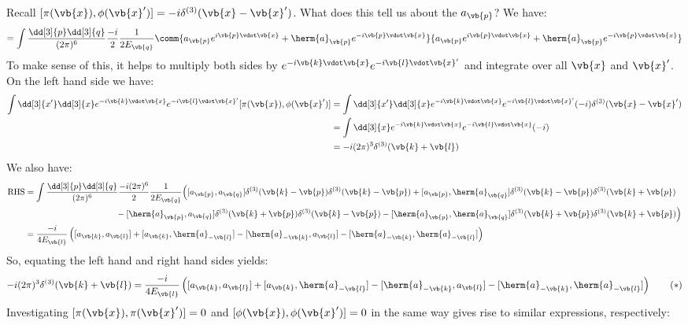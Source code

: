 \documentclass{jknotes} %
\begin{document}
Recall \([\pi(\vb{x}),\phi(\vb{x}')] = -i\delta^{(3)}(\vb{x}-\vb{x}')\). What does this tell us about the \(a_{\vb{p}}\)? We have:
\begin{equation}
    [\pi(\vb{x}),\phi(\vb{x}')] = \int\frac{\dd[3]{p}\dd[3]{q}}{(2\pi)^6}\frac{-i}{2}\frac{1}{2E_{\vb{q}}}
    \comm{a_{\vb{p}} e^{i\vb{p}\vdot\vb{x}} + \herm{a}_{\vb{p}} e^{-i\vb{p}\vdot\vb{x}}}{a_{\vb{p}} e^{i\vb{p}\vdot\vb{x}} + \herm{a}_{\vb{p}} e^{-i\vb{p}\vdot\vb{x}}}
\end{equation}
To make sense of this, it helps to multiply both sides by \(e^{-i\vb{k}\vdot\vb{x}}e^{-i\vb{l}\vdot\vb{x}'}\) and integrate over all \(\vb{x}\) and \(\vb{x}'\). On the left hand side we have:
\begin{align}
    \int\dd[3]{x'}\dd[3]{x} e^{-i\vb{k}\vdot\vb{x}}e^{-i\vb{l}\vdot\vb{x}'} [\pi(\vb{x}),\phi(\vb{x}')]
    &= \int\dd[3]{x'}\dd[3]{x} e^{-i\vb{k}\vdot\vb{x}}e^{-i\vb{l}\vdot\vb{x}'} (-i)\delta^{(3)}(\vb{x}-\vb{x}') \\
    &= \int\dd[3]{x} e^{-i\vb{k}\vdot\vb{x}}e^{-i\vb{l}\vdot\vb{x}} (-i) \\
    &= -i(2\pi)^3\delta^{(3)}(\vb{k}+\vb{l})
\end{align}
We also have:
\begin{align}
    \text{RHS} &= \int \frac{\dd[3]{p}\dd[3]{q}}{(2\pi)^6}\frac{-i(2\pi)^6}{2}\frac{1}{2E_{\vb{q}}} \Big(
    [a_{\vb{p}},a_{\vb{q}}] \delta^{(3)}(\vb{k}-\vb{p}) \delta^{(3)}(\vb{k}-\vb{p}) 
    + [a_{\vb{p}},\herm{a}_{\vb{q}}] \delta^{(3)}(\vb{k}-\vb{p}) \delta^{(3)}(\vb{k}+\vb{p}) \\
    &\qquad\qquad\qquad\qquad\qquad\;\;\,
    - [\herm{a}_{\vb{p}},a_{\vb{q}}] \delta^{(3)}(\vb{k}+\vb{p}) \delta^{(3)}(\vb{k}-\vb{p}) 
    - [\herm{a}_{\vb{p}},\herm{a}_{\vb{q}}] \delta^{(3)}(\vb{k}+\vb{p}) \delta^{(3)}(\vb{k}+\vb{p})
    \Big) \\
    &= \frac{-i}{4E_{\vb{l}}} \left( [a_{\vb{k}},a_{\vb{l}}] + [a_{\vb{k}},\herm{a}_{-\vb{l}}]
    -[\herm{a}_{-\vb{k}},a_{\vb{l}}] - [\herm{a}_{-\vb{k}},\herm{a}_{-\vb{l}}] \right)
\end{align}
So, equating the left hand and right hand sides yields:
\begin{equation}
    -i(2\pi)^3\delta^{(3)}(\vb{k}+\vb{l}) = 
    \frac{-i}{4E_{\vb{l}}} \left( [a_{\vb{k}},a_{\vb{l}}] + [a_{\vb{k}},\herm{a}_{-\vb{l}}]
    -[\herm{a}_{-\vb{k}},a_{\vb{l}}] - [\herm{a}_{-\vb{k}},\herm{a}_{-\vb{l}}] \right)
    \tag{\(*\)}
    \label{firstyield}
\end{equation}
Investigating \([\pi(\vb{x}),\pi(\vb{x}')]=0\) and \([\phi(\vb{x}),\phi(\vb{x}')]=0\) in the same way gives rise to similar expressions, respectively:
\end{document}
